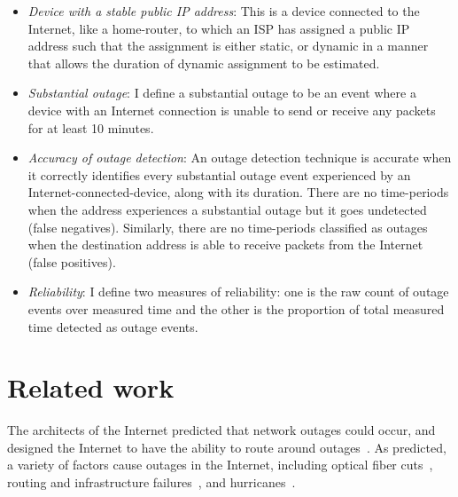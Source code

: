 \begin{itemize}

\item {\emph{Device with a stable public IP address}: This is a device
    connected to the Internet, like a
home-router, to which an ISP has assigned a public IP address such
that the
assignment is either static, or dynamic in a manner that allows the
duration of dynamic assignment to be estimated.}

\item {\emph{Substantial outage}: I define a substantial outage to be an event where a device
    with an Internet connection is unable to send or receive any
    packets for at least 10 minutes.}

\item {\emph{Accuracy of outage detection}: An outage detection technique is accurate when it
correctly identifies every substantial outage event experienced by an Internet-connected-device, along with its
duration. There are no time-periods when the address
experiences a substantial outage but it goes undetected (false
negatives). Similarly, there are no time-periods classified as
outages when the destination address is able to receive packets from the
Internet (false positives).}

\item {\emph{Reliability}: I define two measures of reliability: one is the raw count of outage
events over measured time and the other is the proportion of total measured time
detected as outage events.} %

\end{itemize}

\section{Related work}

The architects of the Internet predicted that network outages could
occur, and designed the Internet to have the ability to route around
outages~\cite{clark-darpa}. As predicted, a variety of factors cause
outages in the Internet, including optical fiber
cuts~\cite{fiber-cuts}, routing and infrastructure
failures~\cite{backbone-failures-1999, ratulbgp}, and
hurricanes~\cite{pingin}.

